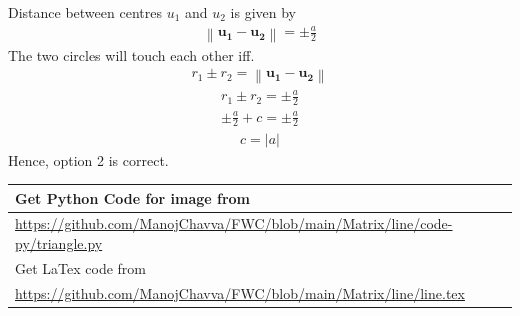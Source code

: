 \documentclass[journal,12pt,twocolumn]{IEEEtran}
\providecommand{\norm}[1]{\left\lVert#1\right\rVert}
\let\vec\mathbf
\begin{document}
\noindent Distance between centres $u_1$ and $u_2 $ is given by
\begin{align}
\norm{\vec{u_1}-\vec{u_2}}= \pm \frac{a}{2}
\end{align}
 \noindent The two circles will touch each other iff.
 \begin{align}
r_1 \pm r_2 = \norm{\vec{u_1}-\vec{u_2}}
\end{align}
\begin{align}
r_1 \pm r_2 = \pm \frac{a}{2}
\end{align}
\begin{align}
\pm \frac{a}{2} +c = \pm \frac{a}{2}
\end{align}
\begin{align}
c = |a|
\end{align}
Hence, option 2 is correct.
\begin{table}[h]
\large
\begin{tabular}{lll}
\multicolumn{3}{l}{Get Python Code for image from}                                                 \\ \hline
\multicolumn{3}{|l|}{\url{https://github.com/ManojChavva/FWC/blob/main/Matrix/line/code-py/triangle.py}} \\ 
 \hline
\multicolumn{3}{l}{Get LaTex code from}                                                            \\ \hline
\multicolumn{3}{|l|}{\url{https://github.com/ManojChavva/FWC/blob/main/Matrix/line/line.tex}}            \\ \hline
\end{tabular}
\end{table}
\end{document}
